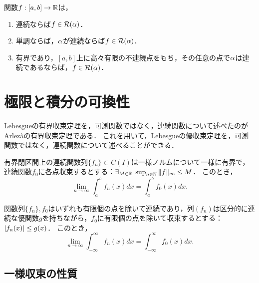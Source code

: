 \documentclass[uplatex, dvipdfmx]{jsreport}
\begin{document}
\begin{theorem}[可積分条件]\mbox{}
    関数$f:[a,b]\to\mathbb{R}$は，
    \begin{enumerate}
        \item 連続ならば$f\in\mathcal{R}(\alpha)$．
        \item 単調ならば，$\alpha$が連続ならば$f\in\mathcal{R}(\alpha)$．
        \item 有界であり，$[a,b]$上に高々有限の不連続点をもち，その任意の点で$\alpha$は連続であるならば，$f\in\mathcal{R}(\alpha)$．
    \end{enumerate}
\end{theorem}

\section{極限と積分の可換性}

\begin{tcolorbox}[colframe=ForestGreen, colback=ForestGreen!10!white,breakable,colbacktitle=ForestGreen!40!white,coltitle=black,fonttitle=\bfseries\sffamily,
title=]
    Lebesgueの有界収束定理を，可測関数ではなく，連続関数について述べたのがArlezàの有界収束定理である．
    これを用いて，Lebesgueの優収束定理を，可測関数ではなく，連続関数について述べることができる．
\end{tcolorbox}

\begin{theorem}[Arzelàの有界収束定理 (1885)]
    有界閉区間上の連続関数列$\{f_n\}\subset C(I)$は一様ノルムについて一様に有界で，連続関数$f_0$に各点収束するとする：$\exists_{M\in\mathbb{R}}\;\sup_{n\in\mathbb{N}}\|f\|_\infty\le M$．
    このとき，
    \[\lim_{n\to\infty}\int^b_af_n(x)dx=\int^b_af_0(x)dx.\]
\end{theorem}

\begin{corollary}
    関数列$\{f_n\},f_0$はいずれも有限個の点を除いて連続であり，列$(f_n)$は区分的に連続な優関数$g$を持ちながら，$f_0$に有限個の点を除いて収束するとする：$\lvert f_n(x)\rvert\le g(x)$．
    このとき，
    \[\lim_{n\to\infty}\int^\infty_{-\infty}f_n(x)dx=\int^\infty_{-\infty}f_0(x)dx.\]
\end{corollary}

\subsection{一様収束の性質}
\end{document}
